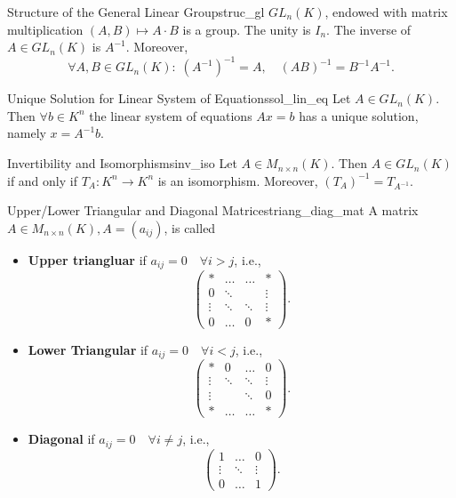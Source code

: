 \begin{proposition}{Structure of the General Linear Group}{struc_gl}
	$GL_n(K)$, endowed with matrix multiplication $(A, B) \mapsto A \cdot B$ is a group. The unity is $I_n$. The inverse of $A \in GL_n(K)$ is $A^{-1}$. Moreover, \[
	\forall A,B \in GL_n(K) :\; (A^{-1})^{-1} = A, \quad (AB)^{-1} = B^{-1}A^{-1}.
	\]
\end{proposition}

\begin{corollary}{Unique Solution for Linear System of Equations}{sol_lin_eq}
	Let $A \in GL_n(K)$. Then $\forall b \in K^n$ the linear system of equations $A  x = b$ has a unique solution, namely $x = A^{-1}b$.
\end{corollary}

\begin{proposition}{Invertibility and Isomorphisms}{inv_iso}
	Let $A \in M_{n \times n}(K)$. Then $A \in GL_n(K)$ if and only if $T_A:K^n \to K^n$ is an isomorphism. Moreover, $(T_A)^{-1} = T_{A^{-1}}$.
\end{proposition}

\begin{definition}{Upper/Lower Triangular and Diagonal Matrices}{triang_diag_mat}
	A matrix $A \in M_{n \times n}(K), A = (a_{ij})$, is called
	\begin{itemize}
		\item[$\bullet$] \textbf{Upper triangluar} if $a_{ij} = 0 \quad \forall i > j$, i.e.,
		\[
		\begin{pmatrix}
			\ast & \hdots & \hdots & \ast\\
			0 & \ddots & & \vdots \\
			\vdots & \ddots & \ddots & \vdots\\
			0 & \hdots & 0 & \ast 
		\end{pmatrix}.
		\]
		\item[$\bullet$] \textbf{Lower Triangular} if $a_{ij} = 0 \quad \forall i < j$, i.e.,
		\[
		\begin{pmatrix}
			\ast & 0 & \hdots & 0\\
			\vdots & \ddots & \ddots & \vdots \\
			\vdots &  & \ddots & 0\\
			\ast & \hdots & \hdots & \ast		
		\end{pmatrix}.
		\]
		\item[$\bullet$] \textbf{Diagonal} if $a_{ij} = 0 \quad \forall i \neq j$, i.e.,
		\[
		\begin{pmatrix}
			1 & \hdots & 0\\
			\vdots & \ddots & \vdots\\
			0 & \hdots & 1
		\end{pmatrix}.
		\]
	\end{itemize}
\end{definition}

